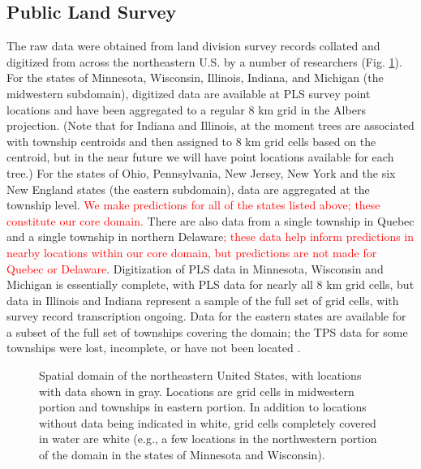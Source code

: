 \documentclass[12pt]{article}\usepackage[]{graphicx}\usepackage[]{color}
\begin{document}
\subsection{Public Land Survey}

The raw data were obtained from land division survey records collated
and digitized from across the northeastern U.S. by a number of researchers
(Fig. \ref{fig:Spatial-domain}). For the states of Minnesota, Wisconsin,
Illinois, Indiana, and Michigan (the midwestern subdomain), digitized
data are available at PLS survey point locations and have been aggregated
to a regular 8 km grid in the Albers projection. (Note that for Indiana
and Illinois, at the moment trees are associated with township centroids
and then assigned to 8 km grid cells based on the centroid, but in
the near future we will have point locations available for each tree.)
For the states of Ohio, Pennsylvania, New Jersey, New York and the
six New England states (the eastern subdomain), data are aggregated
at the township level. \textcolor{red}{We make predictions for all
of the states listed above; these constitute our core domain. }There
are also data from a single township in Quebec and a single township
in northern Delaware\textcolor{red}{; these data help inform predictions
in nearby locations within our core domain, but predictions are not
made for Quebec or Delaware}. Digitization of PLS data in Minnesota,
Wisconsin and Michigan is essentially complete, with PLS data for
nearly all 8 km grid cells, but data in Illinois and Indiana represent
a sample of the full set of grid cells, with survey record transcription
ongoing. Data for the eastern states are available for a subset of
the full set of townships covering the domain; the TPS data for some
townships were lost, incomplete, or have not been located \citep{Cogb:etal:2002}. 

\begin{figure}
\label{fig:domain}

\caption{Spatial domain of the northeastern United States, with locations with
data shown in gray. Locations are grid cells in midwestern portion
and townships in eastern portion. In addition to locations without
data being indicated in white, grid cells completely covered in water
are white (e.g., a few locations in the northwestern portion of the
domain in the states of Minnesota and Wisconsin).\label{fig:Spatial-domain}}
\end{figure}
\end{document}

